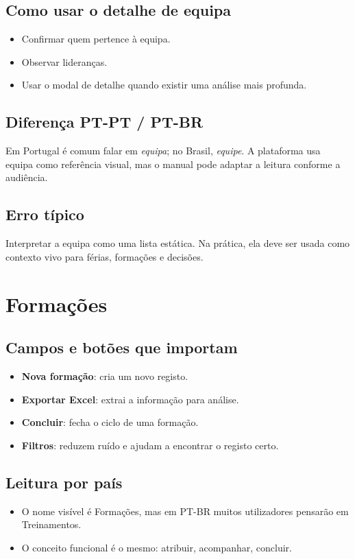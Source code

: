 \subsection{Como usar o detalhe de equipa}
\begin{itemize}
  \item Confirmar quem pertence à equipa.
  \item Observar lideranças.
  \item Usar o modal de detalhe quando existir uma análise mais profunda.
\end{itemize}

\subsection{Diferença PT-PT / PT-BR}
Em Portugal é comum falar em \textit{equipa}; no Brasil, \textit{equipe}. A plataforma usa equipa como referência visual, mas o manual pode adaptar a leitura conforme a audiência.

\subsection{Erro típico}
Interpretar a equipa como uma lista estática. Na prática, ela deve ser usada como contexto vivo para férias, formações e decisões.

\section{Formações}
\subsection{Campos e botões que importam}
\begin{itemize}
  \item \textbf{Nova formação}: cria um novo registo.
  \item \textbf{Exportar Excel}: extrai a informação para análise.
  \item \textbf{Concluir}: fecha o ciclo de uma formação.
  \item \textbf{Filtros}: reduzem ruído e ajudam a encontrar o registo certo.
\end{itemize}

\subsection{Leitura por país}
\begin{itemize}
  \item O nome visível é Formações, mas em PT-BR muitos utilizadores pensarão em Treinamentos.
  \item O conceito funcional é o mesmo: atribuir, acompanhar, concluir.
\end{itemize}

